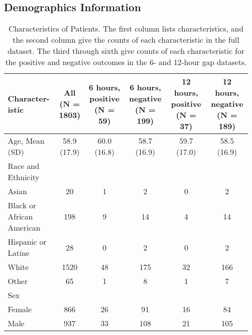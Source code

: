 \subsection{Demographics Information} \label{sec:supp_demographics}
\begin{table}[htb]
    \centering
    \begin{tabularx}{\linewidth}{L C C C C C}
    \hline
    Character-istic & All (N = 1803) & 6 hours, positive (N = 59) & 6 hours, negative (N = 199) & 12 hours, positive (N = 37) & 12 hours, negative (N = 189)\\
    \hline
    Age, Mean (SD) & 58.9 (17.9) & 60.0 (16.8) & 58.7 (16.9) & 59.7 (17.0) & 58.5 (16.9)\\
    \hline
    \hline
    Race and Ethnicity & & & & &\\
    \hline
    Asian & 20 & 1 & 2 & 0 & 2\\
    \hline
    Black or African American & 198 & 9 & 14 & 4 & 14\\
    \hline
    Hispanic or Latine & 28 & 0 & 2 & 0 & 2\\
    \hline
    White & 1520 & 48 & 175 & 32 & 166\\
    \hline
    Other & 65 & 1 & 8 & 1 & 7\\
    \hline
    \hline
    Sex & & &\\
    \hspace{3mm} Female & 866 & 26 & 91 & 16 & 84\\
    \hspace{3mm} Male & 937 & 33 & 108 & 21 & 105\\
    \hline
    \end{tabularx}
    \caption{Characteristics of Patients. The first column lists characteristics, and the second column give the counts of each characteristic in the full dataset. The third through sixth give counts of each characteristic for the positive and negative outcomes in the 6- and 12-hour gap datasets.}
    \label{tab:demographics}
\end{table}